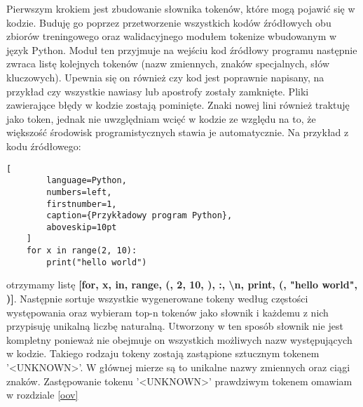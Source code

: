 \begin{description}
Pierwszym krokiem jest zbudowanie słownika tokenów, które mogą pojawić się w kodzie. Buduję go poprzez przetworzenie wszystkich kodów źródłowych obu zbiorów treningowego oraz 
walidacyjnego modułem tokenize \cite{tokenize} wbudowanym w język Python. Moduł ten przyjmuje na wejściu kod źródłowy programu następnie zwraca listę kolejnych tokenów (nazw zmiennych, 
znaków specjalnych, słów kluczowych). Upewnia się on również czy kod jest poprawnie napisany, na przykład czy wszystkie nawiasy lub apostrofy zostały zamknięte. Pliki zawierające błędy w 
kodzie zostają pominięte. 
Znaki nowej lini również traktuję jako token, jednak nie uwzględniam wcięć w kodzie ze względu na to, że większość środowisk programistycznych stawia je 
automatycznie. Na przykład z kodu źródłowego: 
\begin{addmargin}[10mm]{0mm}
    \begin{lstlisting}[
        language=Python,
        numbers=left,
        firstnumber=1,
        caption={Przykładowy program Python},
        aboveskip=10pt
    ]
    for x in range(2, 10): 
        print("hello world")
    \end{lstlisting}
    \end{addmargin}
otrzymamy listę \textbf{ [for, x, in, range, (, 2, 10, ), :, \textbackslash n, print, (, "hello world", )]}.
Następnie sortuje wszystkie wygenerowane tokeny według częstości występowania oraz wybieram top-n tokenów jako słownik i każdemu z nich przypisuję unikalną liczbę naturalną. 
Utworzony w ten sposób słownik nie jest kompletny ponieważ nie obejmuje on wszystkich możliwych nazw występujących w kodzie. Takiego rodzaju tokeny
zostają zastąpione sztucznym tokenem '<UNKNOWN>'. W głównej mierze są to unikalne nazwy zmiennych oraz ciągi znaków. Zastępowanie tokenu '<UNKNOWN>' prawdziwym tokenem omawiam w 
rozdziale \ref{oov}\\


\end{description}
